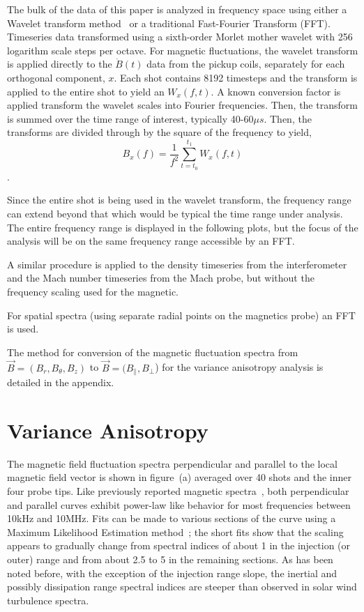 \documentclass[aip,prl,amsmath,amssymb,reprint,superscriptaddress]{revtex4-1} %
\begin{document}
The bulk of the data of this paper is analyzed in frequency space using either a Wavelet transform method~\cite{torrence98} or a traditional Fast-Fourier Transform (FFT). Timeseries data transformed using a sixth-order Morlet mother wavelet with 256 logarithm scale steps per octave. For magnetic fluctuations, the wavelet transform is applied directly to the $\dot{B}(t)$ data from the pickup coils, separately for each orthogonal component, $x$. Each shot contains 8192 timesteps and the transform is applied to the entire shot to yield an $W_{x}(f,t)$. A known conversion factor is applied transform the wavelet scales into Fourier frequencies. Then, the transform is summed over the time range of interest, typically 40-60$\mu s$. Then, the transforms are divided through by the square of the frequency to yield,
\begin{equation}
B_{x}(f) = \frac{1}{f^{2}}\sum_{t=t_{0}}^{t_{1}} W_{x}(f,t)
\label{eq:wavelet_transform}
\end{equation}.

Since the entire shot is being used in the wavelet transform, the frequency range can extend beyond that which would be typical the time range under analysis. The entire frequency range is displayed in the following plots, but the focus of the analysis will be on the same frequency range accessible by an FFT.

A similar procedure is applied to the density timeseries from the interferometer and the Mach number timeseries from the Mach probe, but without the frequency scaling used for the magnetic.

For spatial spectra (using separate radial points on the magnetics probe) an FFT is used.

The method for conversion of the magnetic fluctuation spectra from $\vec{B} = (B_{r},B_{\theta},B_{z})$ to $\vec{B} = (B_{\parallel},B_{\perp}$) for the variance anisotropy analysis is detailed in the appendix.

\section{Variance Anisotropy}\label{sec:variance}

The magnetic field fluctuation spectra perpendicular and parallel to the local magnetic field vector is shown in figure~\cite{fig:spectra}(a) averaged over 40 shots and the inner four probe tips. Like previously reported magnetic spectra~\cite{schaffner14}, both perpendicular and parallel curves exhibit power-law like behavior for most frequencies between 10kHz and 10MHz. Fits can be made to various sections of the curve using a Maximum Likelihood Estimation method~\cite{clauset09}; the short fits show that the scaling appears to gradually change from spectral indices of about 1 in the injection (or outer) range and from about 2.5 to 5 in the remaining sections. As has been noted before, with the exception of the injection range slope, the inertial and possibly dissipation range spectral indices are steeper than observed in solar wind turbulence spectra.
\end{document}
